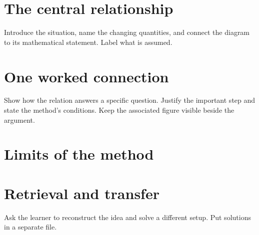 \documentclass[11pt]{article}
\begin{document}
\section*{The central relationship}
Introduce the situation, name the changing quantities, and connect the diagram to its mathematical statement. Label what is assumed.
\section*{One worked connection}
Show how the relation answers a specific question. Justify the important step and state the method's conditions. Keep the associated figure visible beside the argument.
\workarea{1.0in}
\section*{Limits of the method}
\section*{Retrieval and transfer}
Ask the learner to reconstruct the idea and solve a different setup. Put solutions in a separate file.
\end{document}
